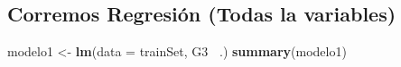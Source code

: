\documentclass[
]{article}
\newenvironment{Shaded}{\begin{snugshade}}{\end{snugshade}}
\newcommand{\DataTypeTok}[1]{\textcolor[rgb]{0.13,0.29,0.53}{#1}}
\newcommand{\FloatTok}[1]{\textcolor[rgb]{0.00,0.00,0.81}{#1}}
\newcommand{\KeywordTok}[1]{\textcolor[rgb]{0.13,0.29,0.53}{\textbf{#1}}}
\newcommand{\NormalTok}[1]{#1}
\newcommand{\OperatorTok}[1]{\textcolor[rgb]{0.81,0.36,0.00}{\textbf{#1}}}
\newcommand{\OtherTok}[1]{\textcolor[rgb]{0.56,0.35,0.01}{#1}}
\newcommand{\StringTok}[1]{\textcolor[rgb]{0.31,0.60,0.02}{#1}}
\begin{document}
\begin{Shaded}
\end{Shaded}

\hypertarget{corremos-regresiuxf3n-todas-la-variables}{%
\subsection{Corremos Regresión (Todas la
variables)}\label{corremos-regresiuxf3n-todas-la-variables}}

\begin{Shaded}
\begin{Highlighting}[]
\NormalTok{modelo1 <-}\StringTok{ }\KeywordTok{lm}\NormalTok{(}\DataTypeTok{data =}\NormalTok{ trainSet, G3 }\OperatorTok{~}\NormalTok{.)}
\KeywordTok{summary}\NormalTok{(modelo1)}
\end{Highlighting}
\end{Shaded}
\end{document}
